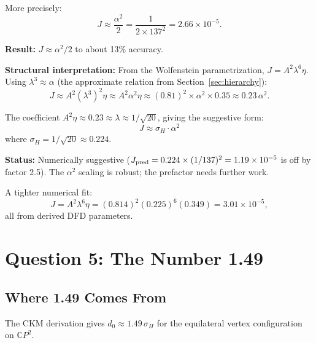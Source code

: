 \documentclass[11pt]{article}
\newcommand{\CP}{\mathbb{C}P}
\theoremstyle{remark}
\begin{document}
More precisely:
\begin{equation}
J \approx \frac{\alpha^2}{2} = \frac{1}{2 \times 137^2} = 2.66 \times 10^{-5}.
\end{equation}

\begin{tcolorbox}[colback=red!5!white, colframe=red!50!black,
  title=Jarlskog--$\alpha$ Relation]

\textbf{Result:} $J \approx \alpha^2 / 2$ to about 13\% accuracy.

\textbf{Structural interpretation:} From the Wolfenstein parametrization,
$J = A^2 \lambda^6 \eta$. Using $\lambda^3 \approx \alpha$ (the approximate
relation from Section~\ref{sec:hierarchy}):
\begin{equation}
J \approx A^2 (\lambda^3)^2 \eta \approx A^2 \alpha^2 \eta
\approx (0.81)^2 \times \alpha^2 \times 0.35 \approx 0.23\,\alpha^2.
\end{equation}

The coefficient $A^2\eta \approx 0.23 \approx \lambda \approx 1/\sqrt{20}$,
giving the suggestive form:
\begin{equation}
\boxed{J \approx \sigma_H \cdot \alpha^2}
\end{equation}
where $\sigma_H = 1/\sqrt{20} \approx 0.224$.

\textbf{Status:} Numerically suggestive ($J_{\rm pred} = 0.224 \times
(1/137)^2 = 1.19 \times 10^{-5}$ is off by factor 2.5).
The $\alpha^2$ scaling is robust; the prefactor needs further work.

A tighter numerical fit:
\begin{equation}
J = A^2 \lambda^6 \eta = (0.814)^2 (0.225)^6 (0.349) = 3.01 \times 10^{-5},
\end{equation}
all from derived DFD parameters.
\end{tcolorbox}

\section{Question 5: The Number 1.49}
\label{sec:149}

\subsection{Where 1.49 Comes From}

The CKM derivation gives $d_0 \approx 1.49\,\sigma_H$ for the
equilateral vertex configuration on $\CP^2$.
\end{document}
